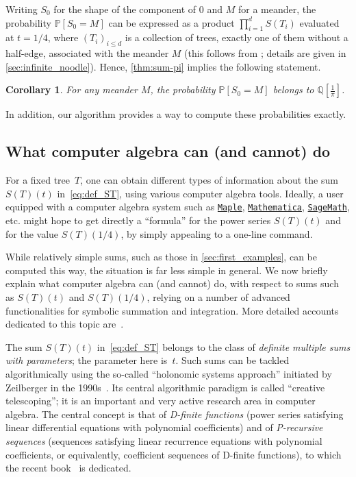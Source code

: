 \documentclass[12pt]{amsart}
\theoremstyle{plain}
\newtheorem{corollary}[lemma]{Corollary}
\theoremstyle{remark}
\begin{document}
Writing $S_0$ for the shape of the component of $0$ and $M$ for a meander,
the probability $\mathbb P[S_0=M]$ can be expressed as a product $\prod_{i=1}^d S(T_i)$ evaluated at $t=1/4$, 
where $(T_i)_{i \le d}$ is a collection of trees, exactly one of them without a half-edge, associated with the meander $M$
(this follows from \cite[Section 4.1]{feray2023meandric}; details are given in \cref{sec:infinite_noodle}).
Hence, \cref{thm:sum-pi} implies the following statement.
\begin{corollary} \label{coro:proba_meanders}
  For any meander $M$, the probability $\mathbb P[S_0=M]$ belongs to $\mathbb Q[\tfrac1{\pi}]$.
\end{corollary}

In addition, our algorithm provides a way to compute these probabilities exactly. 



\subsection{What computer algebra can (and cannot) do}
\label{ssec:intro_computer_algebra}
For a fixed tree~$T$, one can obtain different types of information about the sum $S(T)(t)$ in~\eqref{eq:def_ST}, using various computer algebra tools. Ideally, a user equipped with a computer algebra system such as \href{https://www.maplesoft.com/}{\texttt{Maple}}, \href{https://www.wolfram.com/mathematica/}{\texttt{Mathematica}}, \href{https://www.sagemath.org/}{\texttt{SageMath}}, etc.
might hope to get directly a ``formula'' for the power series $S(T)(t)$ and for the value $S(T)(1/4)$, by simply appealing to a one-line command. 

While relatively simple sums, such as those in \cref{sec:first_examples}, can be computed this way, the situation is far less simple in general. We now briefly explain what computer algebra can (and cannot) do, with respect to sums such as $S(T)(t)$ and $S(T)(1/4)$, relying on a number of advanced functionalities for symbolic summation and integration. More detailed accounts dedicated to this topic are~\cite{Schneider07,Salvy19,KoWo21}.

The sum $S(T)(t)$ in~\eqref{eq:def_ST} belongs to the class of \emph{definite multiple sums with parameters}; the parameter here is~$t$. Such sums can be tackled algorithmically using the so-called ``holonomic systems approach'' initiated by Zeilberger in the 1990s~\cite{Zeilberger90}. Its central algorithmic paradigm is called ``creative telescoping''; it is an important and very active research area in computer algebra. The central concept is that of \emph{D-finite functions} (power series satisfying linear differential equations with polynomial coefficients) and of \emph{P-recursive sequences} (sequences satisfying linear recurrence equations with polynomial coefficients, or equivalently, coefficient sequences of D-finite functions), to which the recent book~\cite{Kauers2023} is dedicated.
\end{document}

